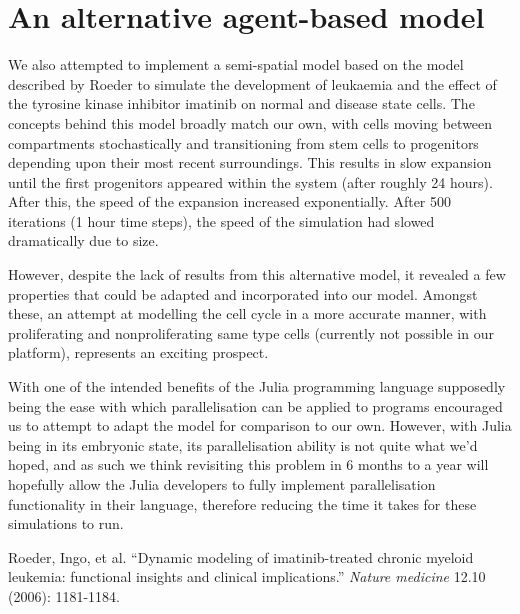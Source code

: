 \documentclass[11.5pt]{article}
\begin{document}
\newpage

\section{An alternative agent-based model}

We also attempted to implement a semi-spatial model based on the model 
described by Roeder to simulate the development of leukaemia and the 
effect of the tyrosine kinase inhibitor imatinib on normal and disease 
state cells. The concepts behind this model broadly match our own, with 
cells moving between compartments stochastically and transitioning from 
stem cells to progenitors depending upon their most recent surroundings. 
This results in slow expansion until the first progenitors appeared 
within the system (after roughly 24 hours). After this, the speed of the 
expansion increased exponentially. After 500 iterations (1 hour time 
steps), the speed of the simulation had slowed dramatically due to size.

However, despite the lack of results from this alternative model, it 
revealed a few properties that could be adapted and incorporated into 
our model. Amongst these, an attempt at modelling the cell cycle in a 
more accurate manner, with proliferating and nonproliferating same type 
cells (currently not possible in our platform), represents an exciting 
prospect.

With one of the intended benefits of the Julia programming language 
supposedly being the ease with which parallelisation can be applied to 
programs encouraged us to attempt to adapt the model for comparison to 
our own. However, with Julia being in its embryonic state, its 
parallelisation ability is not quite what we'd hoped, and as such we 
think revisiting this problem in 6 months to a year will hopefully allow 
the Julia developers to fully implement parallelisation functionality in 
their language, therefore reducing the time it takes for these 
simulations to run.


\newpage

\begin{thebibliography}{9}
  Roeder, Ingo, et al. ``Dynamic modeling of imatinib-treated chronic myeloid leukemia: functional insights and clinical implications.'' {\itshape Nature medicine} 12.10 (2006): 1181-1184.
\end{thebibliography}
\newpage

\end{document}

